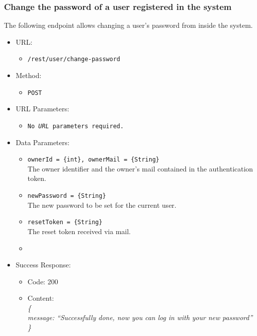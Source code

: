 \newpage
\subsubsection*{Change the password of a user registered in the system}

The following endpoint allows changing a user's password from inside the system.

\begin{itemize}
    
    \item URL: 
    \begin{itemize}
        \item \texttt{/rest/user/change-password}
    \end{itemize}
    
    \item Method: 
    \begin{itemize}
        \item \texttt{POST}
    \end{itemize}
    
    \item URL Parameters: 
    \begin{itemize}
        \item \texttt{No \textit{URL} parameters required.} 
    \end{itemize}
    
    \item Data Parameters: 
    \begin{itemize}
        \item \texttt{ownerId = \{int\}, ownerMail = \{String\}} \\
        The owner identifier and the owner's mail contained in the authentication token.    
        \item \texttt{newPassword = \{String\}} \\
        The new password to be set for the current user.
        \item \texttt{resetToken = \{String\}} \\
        The reset token received via mail.
        \item 
    \end{itemize}
    
    \item Success Response: 
    \begin{itemize}
        \item Code: 200
        \item Content: \\
        \textit{
\{ \\
    message: “Successfully done, now you can log in with your new password” \\
\} 
    }
    \end{itemize}
    

\end{itemize}
